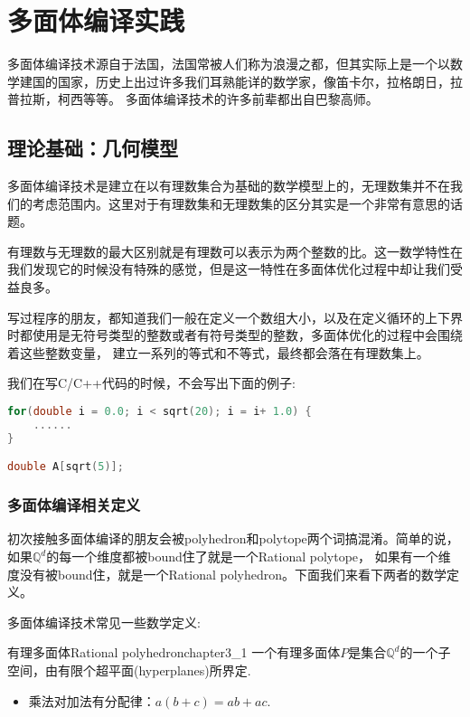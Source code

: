 
\chapter{多面体编译实践}

多面体编译技术源自于法国，法国常被人们称为浪漫之都，但其实际上是一个以数学建国的国家，历史上出过许多我们耳熟能详的数学家，像笛卡尔，拉格朗日，拉普拉斯，柯西等等。
多面体编译技术的许多前辈都出自巴黎高师。

\section{理论基础：几何模型}

多面体编译技术是建立在以有理数集合为基础的数学模型上的，无理数集并不在我们的考虑范围内。这里对于有理数集和无理数集的区分其实是一个非常有意思的话题。

有理数与无理数的最大区别就是有理数可以表示为两个整数的比。这一数学特性在我们发现它的时候没有特殊的感觉，但是这一特性在多面体优化过程中却让我们受益良多。

写过程序的朋友，都知道我们一般在定义一个数组大小，以及在定义循环的上下界时都使用是无符号类型的整数或者有符号类型的整数，多面体优化的过程中会围绕着这些整数变量，
建立一系列的等式和不等式，最终都会落在有理数集上。

我们在写C/C++代码的时候，不会写出下面的例子:
\begin{lstlisting}[language={C}, caption={一段C源代码}]
for(double i = 0.0; i < sqrt(20); i = i+ 1.0) {
    ......
}

double A[sqrt(5)];
\end{lstlisting}


\subsection{多面体编译相关定义}

初次接触多面体编译的朋友会被polyhedron和polytope两个词搞混淆。简单的说，如果$\mathbb{Q}^{d}$的每一个维度都被bound住了就是一个Rational polytope，
如果有一个维度没有被bound住，就是一个Rational polyhedron。下面我们来看下两者的数学定义。

多面体编译技术常见一些数学定义:
\begin{mydef}{有理多面体Rational polyhedron}{chapter3_1}
	一个有理多面体$P$是集合$\mathbb{Q}^{d}$的一个子空间，由有限个超平面(hyperplanes)所界定.
	\begin{itemize}
		\item[(1)] 乘法对加法有分配律：$a ( b + c ) = a b + a c$.
	\end{itemize}
\end{mydef}


